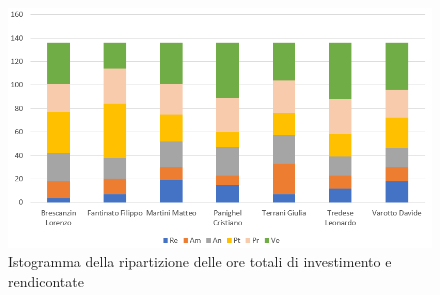 \begin{figure}[H]
    \centering
    \includegraphics[scale = 0.70]{Immagini/TotaleIsto.png}
    \caption{Istogramma della ripartizione delle ore totali di investimento e rendicontate}
    \label{fig:Istogramma ripartizione ore totali di investimento e rendicontate }
\end{figure}
\newpage
